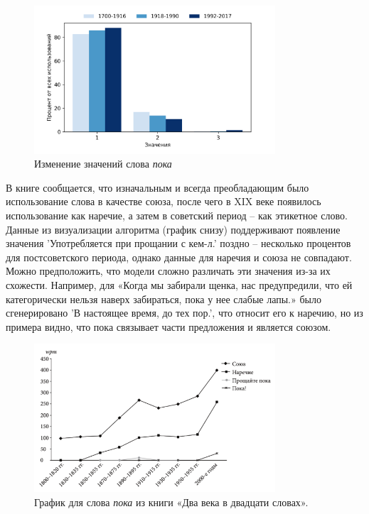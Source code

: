 \documentclass[LI,VKR]{HSEUniversity}
\begin{document}
\begin{figure}[H]
	\centering
	\includegraphics[width=0.8\textwidth]{img/visualizations/poka_minimal}
	\caption{Изменение значений слова \textit{пока}}
	\label{fig:Пока_2}
\end{figure}

В книге сообщается, что изначальным и всегда преобладающим было использование слова в качестве
союза, после чего в XIX веке появилось использование как наречие, а затем в советский период
– как этикетное слово.
Данные из визуализации алгоритма (график снизу) поддерживают появление значения
’Употребляется при прощании с кем-л.’
поздно – несколько процентов для постсоветского периода, однако данные для наречия и союза
не совпадают.
Можно предположить, что модели сложно различать эти значения из-за их схожести.
Например, для
«Когда мы забирали щенка, нас предупредили, что ей категорически нельзя наверх забираться,
пока у нее слабые лапы.»
было сгенерировано ’В настоящее время, до тех пор.’,
что относит его к наречию,
но из примера видно, что пока связывает части предложения и является союзом.

\begin{figure}[H]
    \centering %
    \includegraphics[width=0.8\textwidth]{img/book/poka/all}
    \caption{График для слова \textit{пока} из книги «Два века в двадцати словах».}
\end{figure}
\end{document}
